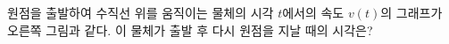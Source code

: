 \noindent\begin{minipage}[t]{0.58\linewidth}\vspace{0pt}\raggedright 원점을 출발하여 수직선 위를 움직이는 물체의 시각 $t$에서의 속도 $v(t)$의 그래프가 오른쪽 그림과 같다. 이 물체가 출발 후 다시 원점을 지날 때의 시각은?\end{minipage}\hfill\begin{minipage}[t]{0.4\linewidth}\vspace{0pt}\centering \resizebox{\ifdim\width>\linewidth\linewidth\else\width\fi}{!}{}\end{minipage}\par
{}
